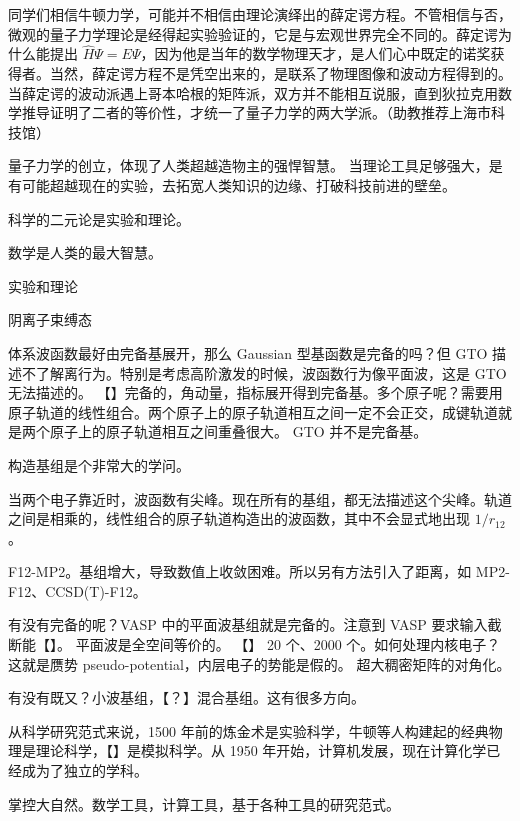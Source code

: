 同学们相信牛顿力学，可能并不相信由理论演绎出的薛定谔方程。不管相信与否，微观的量子力学理论是经得起实验验证的，它是与宏观世界完全不同的。薛定谔为什么能提出 $\hat H \Psi = E \Psi$，因为他是当年的数学物理天才，是人们心中既定的诺奖获得者。当然，薛定谔方程不是凭空出来的，是联系了物理图像和波动方程得到的。当薛定谔的波动派遇上哥本哈根的矩阵派，双方并不能相互说服，直到狄拉克用数学推导证明了二者的等价性，才统一了量子力学的两大学派。（助教推荐上海市科技馆）

量子力学的创立，体现了人类超越造物主的强悍智慧。
当理论工具足够强大，是有可能超越现在的实验，去拓宽人类知识的边缘、打破科技前进的壁垒。




科学的二元论是实验和理论。

数学是人类的最大智慧。

实验和理论



阴离子束缚态


体系波函数最好由完备基展开，那么 Gaussian 型基函数是完备的吗？但 GTO 描述不了解离行为。特别是考虑高阶激发的时候，波函数行为像平面波，这是 GTO 无法描述的。
【】完备的，角动量，指标展开得到完备基。多个原子呢？需要用原子轨道的线性组合。两个原子上的原子轨道相互之间一定不会正交，成键轨道就是两个原子上的原子轨道相互之间重叠很大。
GTO 并不是完备基。

构造基组是个非常大的学问。

当两个电子靠近时，波函数有尖峰。现在所有的基组，都无法描述这个尖峰。轨道之间是相乘的，线性组合的原子轨道构造出的波函数，其中不会显式地出现 $1/r_{12}$。

F12-MP2。基组增大，导致数值上收敛困难。所以另有方法引入了距离，如 MP2-F12、CCSD(T)-F12。

有没有完备的呢？VASP 中的平面波基组就是完备的。注意到 VASP 要求输入截断能【】。
平面波是全空间等价的。
【】
20 个、2000 个。如何处理内核电子？这就是赝势 pseudo-potential，内层电子的势能是假的。
超大稠密矩阵的对角化。

有没有既又？小波基组，【？】混合基组。这有很多方向。

从科学研究范式来说，1500 年前的炼金术是实验科学，牛顿等人构建起的经典物理是理论科学，【】是模拟科学。从 1950 年开始，计算机发展，现在计算化学已经成为了独立的学科。

掌控大自然。数学工具，计算工具，基于各种工具的研究范式。


